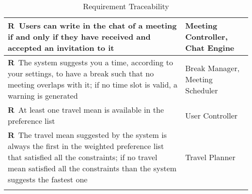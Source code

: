 \begin{longtable}{|m{7cm}|m{7cm}|}
	\textbf{R\reqNum}~Users can write in the chat of a meeting if and only if they have received and accepted an invitation to it & Meeting Controller, Chat Engine	\\ \hline
	\textbf{R\reqNum}~The system suggests you a time, according to your settings, to have a break such that no meeting overlaps with it; if no time slot is valid, a warning is generated & Break Manager, Meeting Scheduler	\\ \hline
	\textbf{R\reqNum}~At least one travel mean is available in the preference list & User Controller	\\ \hline
	\textbf{R\reqNum}~The travel mean suggested by the system is always the first in the weighted preference list that satisfied all the constraints; if no travel mean satisfied all the constraints than the system suggests the fastest one & Travel Planner	\\ \hline
	\caption{Requirement Traceability}
\end{longtable}